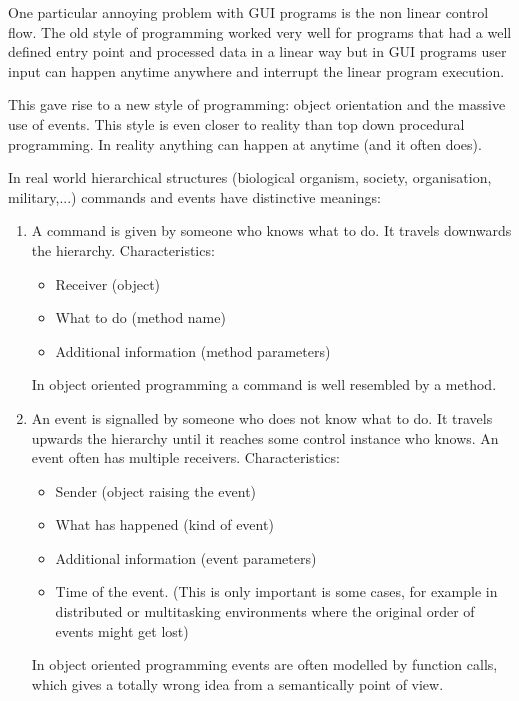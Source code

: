 One particular annoying problem with GUI programs is the non linear
control flow. The old style of programming worked very well for programs
that had a well defined entry point and processed data in a linear way
but in GUI programs user input can happen anytime anywhere and interrupt
the linear program execution.

This gave rise to a new style of programming: object orientation and the
massive use of events. This style is even closer to reality than top
down procedural programming. In reality anything can happen at anytime
(and it often does).

In real world hierarchical structures (biological organism, society,
organisation, military,...) commands and events have distinctive
meanings:

\begin{enumerate}
\item
  A command is given by someone who knows what to do. It travels
  downwards the hierarchy. Characteristics:

  \begin{itemize}
  \item
    Receiver (object)
  \item
    What to do (method name)
  \item
    Additional information (method parameters)
  \end{itemize}

  In object oriented programming a command is well resembled by a
  method.
\item
  An event is signalled by someone who does not know what to do. It
  travels upwards the hierarchy until it reaches some control instance
  who knows. An event often has multiple receivers. Characteristics:

  \begin{itemize}
  \item
    Sender (object raising the event)
  \item
    What has happened (kind of event)
  \item
    Additional information (event parameters)
  \item
    Time of the event. (This is only important is some cases, for
    example in distributed or multitasking environments where the
    original order of events might get lost)
  \end{itemize}

  In object oriented programming events are often modelled by function
  calls, which gives a totally wrong idea from a semantically point of
  view.
\end{enumerate}

